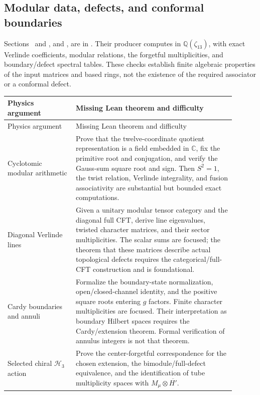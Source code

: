 \subsection{Modular data, defects, and conformal boundaries}

Sections~ and ,
\emph{} and
\emph{}, are in
. Their
producer  computes in
$\mathbb Q(\zeta_{13})$, with exact Verlinde coefficients, modular
relations, the forgetful multiplicities, and boundary/defect spectral
tables. These checks establish finite algebraic properties of the
input matrices and based rings, not the existence of the required
associator or a conformal defect.

\begin{longtable}{@{}P{0.27\linewidth}P{0.63\linewidth}@{}}
\toprule
Physics argument & Missing Lean theorem and difficulty\\
\midrule\endfirsthead
\toprule Physics argument & Missing Lean theorem and difficulty\\
\midrule\endhead\bottomrule\endfoot
Cyclotomic modular arithmetic
& Prove that the twelve-coordinate quotient representation is a
field embedded in $\mathbb C$, fix the primitive root and conjugation,
and verify the Gauss-sum square root and sign. Then $S^2=1$, the
twist relation, Verlinde integrality, and fusion associativity are
substantial but bounded exact computations.\\
Diagonal Verlinde lines
& Given a unitary modular tensor category and the diagonal full CFT,
derive line eigenvalues, twisted character matrices, and their
sector multiplicities. The scalar sums are focused; the theorem that
these matrices describe actual topological defects requires the
categorical/full-CFT construction and is foundational.\\
Cardy boundaries and annuli
& Formalize the boundary-state normalization, open/closed-channel
identity, and the positive square roots entering $g$ factors.
Finite character multiplicities are focused. Their interpretation
as boundary Hilbert spaces requires the Cardy/extension theorem.
Formal verification of annulus integers is not that theorem.\\
Selected chiral $\mathcal H_3$ action
& Prove the center-forgetful correspondence for the chosen extension,
the bimodule/full-defect equivalence, and the identification of tube
multiplicity spaces with $M_\mu\otimes\overline{H'}$.

\end{longtable}
